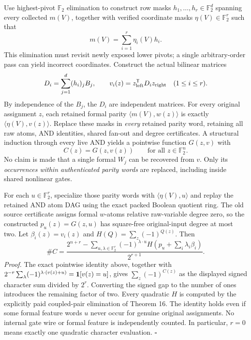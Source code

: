 \documentclass[11pt]{article}
\begin{document}
Use highest-pivot $\mathbb F_2$ elimination to construct row masks
$h_1,\ldots,h_r\in\mathbb F_2^d$ spanning every collected $m(V)$,
together with verified coordinate masks $\eta(V)\in\mathbb F_2^r$
such that
\[
m(V)=\sum_{i=1}^r\eta_i(V)h_i.
\]
This elimination must revisit newly exposed lower pivots; a
single arbitrary-order pass can yield incorrect coordinates.
Construct the actual bilinear matrices
\[
D_i=\sum_{j=1}^d(h_i)_jB_j,\qquad
v_i(z)=z_{\rm left}^{\mathsf T}D_i z_{\rm right}
\quad (1\le i\le r).
\]
By independence of the $B_j$, the $D_i$ are independent matrices.
For every original assignment $z$, each retained formal parity
$\langle m(V),w(z)\rangle$ is exactly
$\langle\eta(V),v(z)\rangle$. Replace these masks in
\emph{every} retained parity word, retaining all raw atoms, AND
identities, shared fan-out and degree certificates. A structural
induction through every live AND yields a pointwise function
$G(z,v)$ with
\[
C(z)=G(z,v(z))\qquad\text{for all }z\in\mathbb F_2^n.
\]
No claim is made that a single formal $W_j$ can be recovered from
$v$. Only its \emph{occurrences within authenticated parity words}
are replaced, including inside shared nonlinear gates.

For each $u\in\mathbb F_2^r$, specialize those parity words with
$\langle\eta(V),u\rangle$ and replay the retained AND atom DAG using
the exact packed Boolean quotient ring.
The old source certificate assigns formal $w$-atoms relative
raw-variable degree zero, so the constructed $p_u(z)=G(z,u)$
has square-free original-input degree at most two.
Let $\beta_i(z)=v_i(z)$ and
$H(Q)=\sum_z(-1)^{Q(z)}$. Then
\[
\boxed{\#C=
\frac{2^{n+r}-
\displaystyle\sum_{u,\lambda\in\mathbb F_2^r}
(-1)^{\lambda\cdot u}
H\!\left(p_u+\sum_i\lambda_i\beta_i\right)}
{2^{r+1}}.}
\]
\emph{Proof.} The exact pointwise identity above, together with
$2^{-r}\sum_{\lambda}(-1)^{\lambda\cdot(v(z)+u)}
={\bf1}[v(z)=u]$, gives
$\sum_z(-1)^{C(z)}$ as the displayed signed character
sum divided by $2^r$. Converting the signed gap to the number
of ones introduces the remaining factor of two. Every
quadratic $H$ is computed by the explicitly paid coupled-pair
elimination of Theorem 16. The identity holds even if some formal
feature words $u$ never occur for genuine original assignments.
No internal gate wire or formal feature is independently
counted. In particular, $r=0$ means exactly one quadratic
character evaluation. \hfill$\square$
\end{document}
